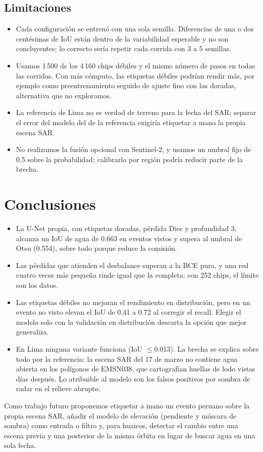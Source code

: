 \documentclass[10pt]{article}
\begin{document}
\subsection{Limitaciones}
\begin{itemize}
\item Cada configuración se entrenó con una sola semilla. Diferencias de una o dos centésimas de IoU están dentro de la variabilidad esperable y no son concluyentes; lo correcto sería repetir cada corrida con 3 a 5 semillas.
\item Usamos 1\,500 de los 4\,160 chips débiles y el mismo número de pasos en todas las corridas. Con más cómputo, las etiquetas débiles podrían rendir más, por ejemplo como preentrenamiento seguido de ajuste fino con las doradas, alternativa que no exploramos.
\item La referencia de Lima no es verdad de terreno para la fecha del SAR; separar el error del modelo del de la referencia exigiría etiquetar a mano la propia escena SAR.
\item No realizamos la fusión opcional con Sentinel-2, y usamos un umbral fijo de 0.5 sobre la probabilidad; calibrarlo por región podría reducir parte de la brecha.
\end{itemize}

\section{Conclusiones}
\begin{itemize}
\item La U-Net propia, con etiquetas doradas, pérdida Dice y profundidad 3, alcanza un IoU de agua de 0.663 en eventos vistos y supera al umbral de Otsu (0.554), sobre todo porque reduce la comisión.
\item Las pérdidas que atienden el desbalance superan a la BCE pura, y una red cuatro veces más pequeña rinde igual que la completa: con 252 chips, el límite son los datos.
\item Las etiquetas débiles no mejoran el rendimiento en distribución, pero en un evento no visto elevan el IoU de 0.41 a 0.72 al corregir el recall. Elegir el modelo solo con la validación en distribución descarta la opción que mejor generaliza.
\item En Lima ninguna variante funciona (IoU $\leq$0.013). La brecha se explica sobre todo por la referencia: la escena SAR del 17 de marzo no contiene agua abierta en los polígonos de EMSN038, que cartografían huellas de lodo vistas días después. Lo atribuible al modelo son los falsos positivos por sombra de radar en el relieve abrupto.
\end{itemize}
Como trabajo futuro proponemos etiquetar a mano un evento peruano sobre la propia escena SAR, añadir el modelo de elevación (pendiente y máscara de sombra) como entrada o filtro y, para huaicos, detectar el cambio entre una escena previa y una posterior de la misma órbita en lugar de buscar agua en una sola fecha.
\end{document}
